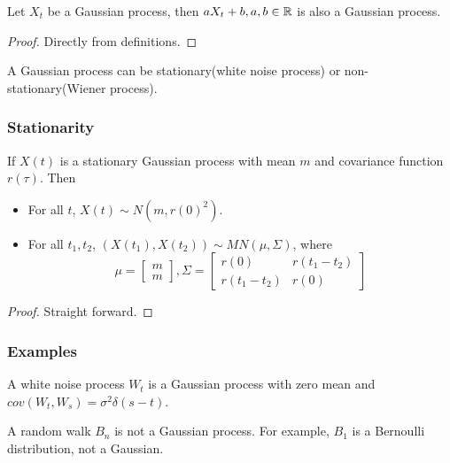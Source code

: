 \begin{refsection}
\begin{lemma}
Let $X_t$ be a Gaussian process, then $aX_t + b, a, b\in \mathbb{R}$ is also a Gaussian process. 
\end{lemma}
\begin{proof}
Directly from definitions.
\end{proof}




\begin{note}
	A Gaussian process can be stationary(white noise process) or non-stationary(Wiener process).
\end{note}


\subsubsection{Stationarity}

\begin{lemma}
If $X(t)$ is a stationary Gaussian process with mean $m$ and covariance function $r(\tau)$.
Then
\begin{itemize}
	\item For all $t$, $X(t)\sim N(m, r(0)^2)$.
	\item For all $t_1,t_2$, $(X(t_1),X(t_2)) \sim MN(\mu, \Sigma)$,
	where
	$$\mu = \begin{bmatrix}
	m\\
	m
	\end{bmatrix}, \Sigma = \begin{bmatrix}
	r(0) & r(t_1 - t_2) \\
	r(t_1-t_2) & r(0) 
	\end{bmatrix}$$
\end{itemize}	
\end{lemma}
\begin{proof}
Straight forward.
\end{proof}


\subsubsection{Examples}

\begin{example}
A white noise process $W_t$ is a Gaussian process with zero mean and $cov(W_t,W_s) = \sigma^2\delta(s-t).$
\end{example}

\begin{example}
A random walk $B_n$ is not a Gaussian process. For example, $B_1$ is a Bernoulli distribution, not a Gaussian.
\end{example}


\end{refsection}
